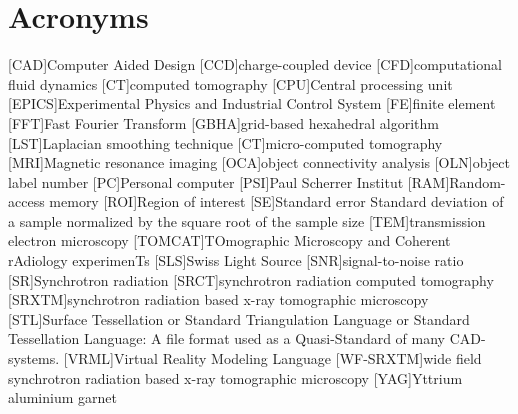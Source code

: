     \chapter*{Acronyms}
	\begin{acronym}[ACRONYM]
		[CAD]{Computer Aided Design}
		[CCD]{charge-coupled device}
		[CFD]{computational fluid dynamics}
		[CT]{computed tomography}
		[CPU]{Central processing unit}
		[EPICS]{Experimental Physics and Industrial Control System}
		[FE]{finite element}
		[FFT]{Fast Fourier Transform}
		{grid-based hexahedral algorithm}
		[LST]{Laplacian smoothing technique}
		[\micro CT]{micro-computed tomography}
		[MRI]{Magnetic resonance imaging}
		[OCA]{object connectivity analysis}
		[OLN]{object label number}
		[PC]{Personal computer}
		[PSI]{Paul Scherrer Institut}
		[RAM]{Random-access memory}
		[ROI]{Region of interest}
		[SE]{Standard error} Standard deviation of a sample normalized by the square root of the sample size
		[TEM]{transmission electron microscopy}
		[TOMCAT]{TOmographic Microscopy and Coherent rAdiology experimenTs}
		[SLS]{Swiss Light Source}
		[SNR]{signal-to-noise ratio}
		[SR]{Synchrotron radiation}
		{synchrotron radiation computed tomography}
		[SRXTM]{synchrotron radiation based x-ray tomographic microscopy}
		[STL]{Surface Tessellation or Standard Triangulation Language or Standard Tessellation Language}: A file format used as a Quasi-Standard of many \acs{CAD}-systems.
		{Virtual Reality Modeling Language}
		[WF-SRXTM]{wide field synchrotron radiation based x-ray tomographic microscopy}
		[YAG]{Yttrium aluminium garnet}
	\end{acronym}
\endgroup

\cleardoublepage